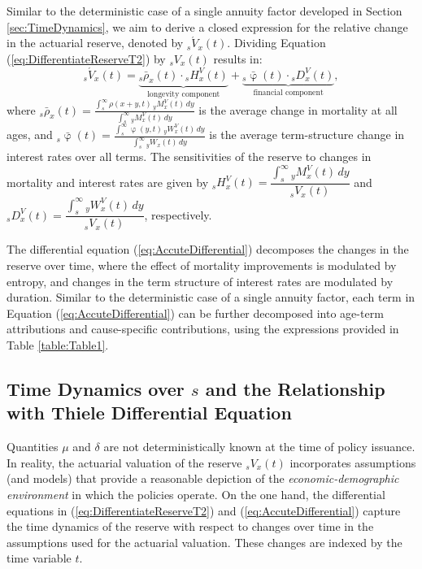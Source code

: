 \documentclass[12pt]{article}
\begin{document}
Similar to the deterministic case of a single annuity factor developed in Section \ref{sec:TimeDynamics}, we aim to derive a closed expression for the relative change in the actuarial reserve, denoted by ${}_s\acute{V}_x(t)$. Dividing Equation (\ref{eq:DifferentiateReserveT2}) by ${}_sV_x(t)$ results in:
\begin{equation}\label{eq:AccuteDifferential}
	{}_s\acute{V}_x(t) = \underbrace{{}_s\bar{\rho}_x(t) \cdot {}_sH_x^V(t)}_\text{longevity component} + \underbrace{{}_s\bar{\upvarphi}(t) \cdot {}_sD_x^V(t)}_\text{financial component},
\end{equation}
where ${}_s\bar{\rho}_x(t) = \frac{\int_s^\infty \rho(x+y,t) \, {}_yM^V_x(t) \, dy}{\int_s^\infty {}_yM^V_x(t) \, dy}$ is the average change in mortality at all ages, and ${}_s\bar{\upvarphi}(t) = \frac{\int_s^\infty \upvarphi(y,t) \, {}_yW^V_x(t) \, dy}{\int_s^\infty {}_yW_x(t) \, dy}$ is the average term-structure change in interest rates over all terms. The sensitivities of the reserve to changes in mortality and interest rates are given by ${}_sH_x^V(t) = \dfrac{\int_{s}^{\infty} {}_yM^V_x(t) \, dy}{{}_sV_x(t)}$ and ${}_sD_x^V(t) = \dfrac{\int_{s}^{\infty} {}_yW^V_x(t) \, dy}{{}_sV_x(t)}$, respectively.

The differential equation (\ref{eq:AccuteDifferential}) decomposes the changes in the reserve over time, where the effect of mortality improvements is modulated by entropy, and changes in the term structure of interest rates are modulated by duration. Similar to the deterministic case of a single annuity factor, each term in Equation (\ref{eq:AccuteDifferential}) can be further decomposed into age-term attributions and cause-specific contributions, using the expressions provided in Table \ref{table:Table1}.



\subsection{Time Dynamics over $s$ and the Relationship with Thiele Differential Equation}\label{sec:ThieleEquations}


Quantities \( \mu \) and \( \delta \) are not deterministically known at the time of policy issuance. In reality, the actuarial valuation of the reserve \( {}_sV_x(t) \) incorporates assumptions (and models) that provide a reasonable depiction of the \textit{economic-demographic environment} in which the policies operate. On the one hand, the differential equations in (\ref{eq:DifferentiateReserveT2}) and (\ref{eq:AccuteDifferential}) capture the time dynamics of the reserve with respect to changes over time in the assumptions used for the actuarial valuation. These changes are indexed by the time variable \( t \).
\end{document}
